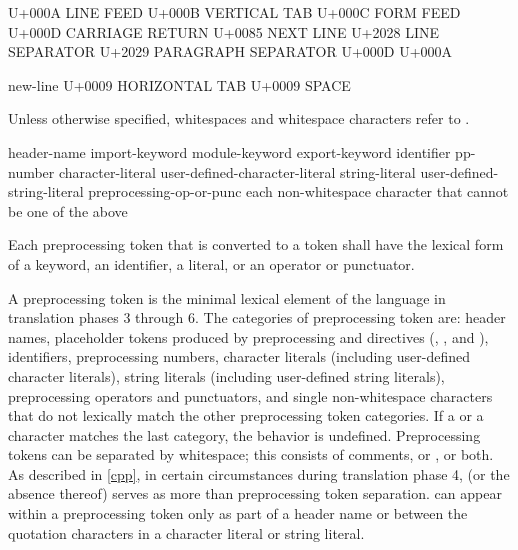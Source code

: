 \documentclass{wg21}
\begin{document}
\begin{addedblock}
\begin{bnf}
\br
    \textnormal{U+000A LINE FEED}\br
    \textnormal{U+000B VERTICAL TAB}\br
    \textnormal{U+000C FORM FEED}\br
    \textnormal{U+000D CARRIAGE RETURN}\br
    \textnormal{U+0085 NEXT LINE}\br
    \textnormal{U+2028 LINE SEPARATOR}\br
    \textnormal{U+2029 PARAGRAPH SEPARATOR}\br
    \textnormal{U+000D U+000A}
\end{bnf}

\begin{bnf}
    \br
    new-line\br
    \textnormal{U+0009 HORIZONTAL TAB}\br
    \textnormal{U+0009 SPACE}\br
\end{bnf}

Unless otherwise specified, whitespaces and whitespace characters refer to .

\end{addedblock}

\begin{bnf}
    \br
    header-name\br
    import-keyword\br
    module-keyword\br
    export-keyword\br
    identifier\br
    pp-number\br
    character-literal\br
    user-defined-character-literal\br
    string-literal\br
    user-defined-string-literal\br
    preprocessing-op-or-punc\br
    \textnormal{each non-whitespace character that cannot be one of the above}
\end{bnf}

\pnum
Each preprocessing token that is converted to a token
shall have the lexical form of a keyword, an identifier, a literal,
or an operator or punctuator.

\pnum
A preprocessing token is the minimal lexical element of the language in translation
phases 3 through 6. The categories of preprocessing token are: header names,
placeholder tokens produced by preprocessing  and  directives
(, , and ),
identifiers, preprocessing numbers, character literals (including user-defined character
literals), string literals (including user-defined string literals), preprocessing
operators and punctuators, and single non-whitespace characters that do not lexically
match the other preprocessing token categories. If a  or a  character
matches the last category, the behavior is undefined. Preprocessing tokens can be
separated by
%
whitespace;
this consists of comments, or 
, or both. As described in \ref{cpp}, in certain
circumstances during translation phase 4,  (or the absence
thereof) serves as more than preprocessing token separation. 
can appear within a preprocessing token only as part of a header name or
between the quotation characters in a character literal or
string literal.
\end{document}
